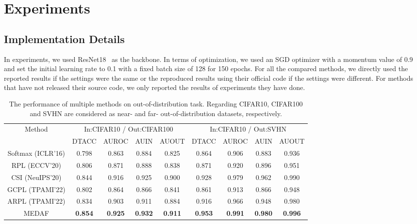 \documentclass[letterpaper]{article} %
\begin{document}
\section{Experiments}
\subsection{Implementation Details}
In experiments, we used ResNet18~\cite{he2016deep} as the backbone. In terms of optimization, we used an SGD optimizer with a momentum value of 0.9 and set the initial learning rate to 0.1 with a fixed batch size of 128 for 150 epochs. For all the compared methods, we directly used the reported results if the settings were the same or the reproduced results using their official code if the settings were different. For methods that have not released their source code, we only reported the results of experiments they have done.
\begin{table}[t]
\centering
\small
\begin{tabular}{ccccccccc}
    \hline
    \multirow{2}[4]{*}{Method}&\multicolumn{4}{c}{In:CIFAR10 / Out:CIFAR100} & \multicolumn{4}{c}{In:CIFAR10 / Out:SVHN} \\
    \cline{2-5} \cline{6-9}
    & DTACC & AUROC & AUIN  & AUOUT & DTACC & AUROC & AUIN  & AUOUT \\ \hline
    Softmax (ICLR'16)& 0.798 & 0.863 & 0.884 & 0.825 & 0.864 & 0.906 & 0.883 & 0.936 \\ 
    RPL (ECCV'20)& 0.806 & 0.871 & 0.888 & 0.838 & 0.871 & 0.920 & 0.896 & 0.951 \\ 
    CSI (NeuIPS'20)& 0.844 & 0.916 & 0.925 & 0.900 & 0.928 & 0.979 & 0.962 & 0.990 \\ 
    GCPL (TPAMI'22)& 0.802 & 0.864 & 0.866 & 0.841 & 0.861 & 0.913 & 0.866 & 0.948 \\ 
    ARPL (TPAMI'22)& 0.834 & 0.903 & 0.911 & 0.884 & 0.916 & 0.966 & 0.948 & 0.980 \\ \hline
    MEDAF & \textbf{0.854} & \textbf{0.925} & \textbf{0.932} & \textbf{0.911} & \textbf{0.953} & \textbf{0.991} & \textbf{0.980} & \textbf{0.996} \\ \hline
\end{tabular}
\caption{The performance of multiple methods on out-of-distribution task. Regarding CIFAR10, CIFAR100 and SVHN are considered as near- and far- out-of-distribution datasets, respectively.}
\label{table_ood}
\end{table}
\end{document}
